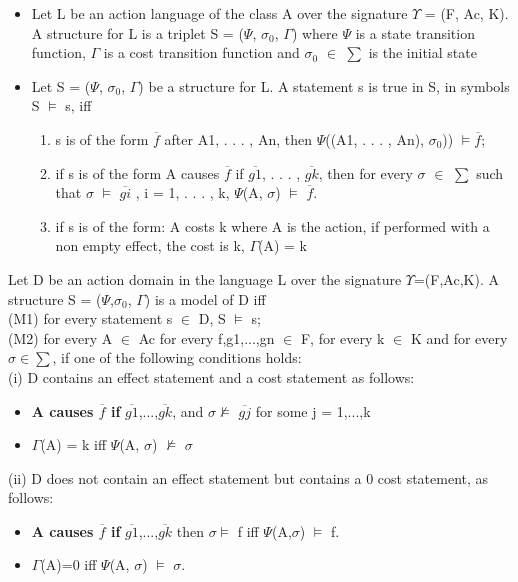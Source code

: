 \documentclass[11pt]{article}
\begin{document}
\begin{itemize}
\item 	Let L be an action language of the class A over the signature $\Upsilon$ = (F, Ac, K). A structure for L is a triplet S = ($\Psi$, $\sigma_{0}$, $\Gamma$) where $\Psi$ is a state transition function, $\Gamma$ is a  cost transition function  and $\sigma_{0}$ $\in$ $\sum$ is the initial state

\item 	Let S = ($\Psi$, $\sigma_{0}$, $\Gamma$) be a structure for L. A statement s is true in S, in symbols S   $\vDash$   s, iff 
\begin{enumerate}
\item s is of the form $\overline{f}$ after A1, . . . , An, then $\Psi$((A1, . . . , An), $\sigma_{0}$))   $\vDash \overline{f}$;

\item if s is of the form A causes $\overline{f}$ if $\overline{g1}$, . . . , $\overline{gk}$, then for every $\sigma$ $\in$ $\sum$ such that $\sigma$  $\vDash$  $\overline{gi}$ , i = 1, . . . , k, $\Psi$(A, $\sigma$)   $\vDash$   $\overline{f}$.

\item if s is of the form: A costs k where A is the action, if performed with a non empty effect, the cost is k, $\Gamma$(A) = k
\end{enumerate}
 

\end{itemize}
Let D be an action domain in the language L over the signature $\Upsilon$=(F,Ac,K). A structure S = ($\Psi$,$\sigma_{0}$, $\Gamma$) is a model of D iff\\
(M1) for every statement s $\in$ D, S $\vDash$ s;\\
(M2) for every A $\in$ Ac for every f,g1,...,gn $\in$ F, for every k $\in$ K and for every $\sigma\in\sum$, if one of the following conditions holds:
\\
(i) D contains an effect statement and a cost statement as follows:
\begin{itemize}
	\item {\bfseries A causes $\overline{f}$ if} $\overline{g1}$,...,$\overline{gk}$, and $\sigma \nvDash$  $\overline{gj}$ for some j = 1,...,k

	\item $\Gamma$(A) = k iff $\Psi$(A, $\sigma$) $\nvDash$ $\sigma$
\end{itemize}
(ii) D does not contain an effect statement but contains a 0 cost statement, as follows:
\begin{itemize}
\item {\bfseries A causes $\overline{f}$ if} $\overline{g1}$,...,$\overline{gk}$ then $\sigma \vDash$ f iff $\Psi$(A,$\sigma$) $\vDash$ f.

\item $\Gamma$(A)=0 iff $\Psi$(A, $\sigma$) $\vDash$ $\sigma$.
\end{itemize}
\end{document}
